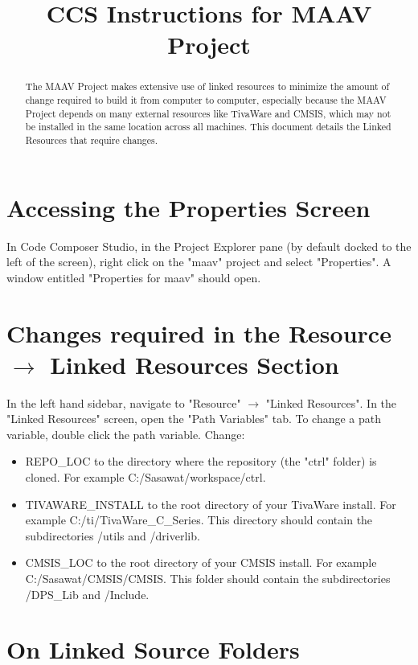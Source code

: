 \documentclass[]{article}
\title{CCS Instructions for MAAV Project}
\begin{document}
\maketitle

\begin{abstract}

The MAAV Project makes extensive use of linked resources to minimize the amount of change required to build it from computer to computer, especially because the MAAV Project depends on many external resources like TivaWare and CMSIS, which may not be installed in the same location across all machines. This document details the Linked Resources that require changes. 

\end{abstract}

\section{Accessing the Properties Screen}

In Code Composer Studio, in the Project Explorer pane (by default docked to the left of the screen), right click on the "maav" project and select "Properties". A window entitled "Properties for maav" should open. 

\section{Changes required in the Resource $\rightarrow$ Linked Resources Section}

In the left hand sidebar, navigate to "Resource" $\rightarrow$ "Linked Resources". In the "Linked Resources" screen, open the "Path Variables" tab. To change a path variable, double click the path variable. Change:
\begin{itemize}
\item REPO\_LOC to the directory where the repository (the "ctrl" folder) is cloned. For example C:/Sasawat/workspace/ctrl. 
\item TIVAWARE\_INSTALL to the root directory of your TivaWare install. For example C:/ti/TivaWare\_C\_Series. This directory should contain the subdirectories /utils and /driverlib. 
\item CMSIS\_LOC to the root directory of your CMSIS install. For example C:/Sasawat/CMSIS/CMSIS. This folder should contain the subdirectories /DPS\_Lib and /Include. 
\end{itemize}

\section{On Linked Source Folders}
\end{document}
